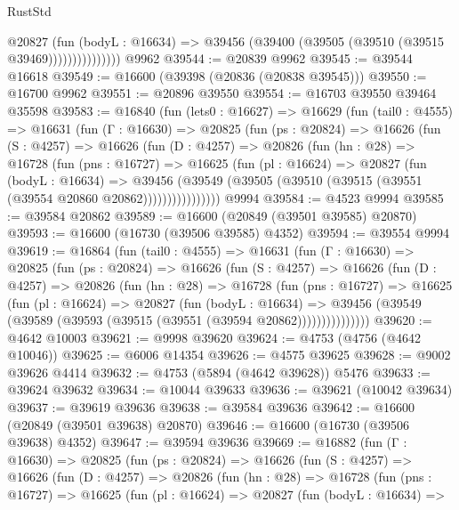 \begin{lexlean}{RustStd}
\begin{coremodule}
{\begin{coremodule}
{{{{{{{{{{{{{{{{{{{{{{{{{{{{{{{{{{{{{{{{{{{{{{{{{{{{{{{                      @20827
                        (fun (bodyL : @16634) =>
                        @39456 (@39400 (@39505 (@39510 (@39515 @39469)))))))))))))))
    @9962
@39544 := @20839 @9962
@39545 := @39544 @16618
@39549 := @16600 (@39398 (@20836 (@20838 @39545)))
@39550 := @16700 @9962
@39551 := @20896 @39550
@39554 := @16703 @39550 @39464 @35598
@39583 := @16840
    (fun (lets0 : @16627) =>
    @16629
      (fun (tail0 : @4555) =>
      @16631
        (fun (Γ : @16630) =>
        @20825
          (fun (ps : @20824) =>
          @16626
            (fun (S : @4257) =>
            @16626
              (fun (D : @4257) =>
              @20826
                (fun (hn : @28) =>
                @16728
                  (fun (pns : @16727) =>
                  @16625
                    (fun (pl : @16624) =>
                    @20827
                      (fun (bodyL : @16634) =>
                      @39456
                        (@39549
                          (@39505 (@39510 (@39515 (@39551 (@39554 @20860 @20862))))))))))))))))
    @9994
@39584 := @4523 @9994
@39585 := @39584 @20862
@39589 := @16600 (@20849 (@39501 @39585) @20870)
@39593 := @16600 (@16730 (@39506 @39585) @4352)
@39594 := @39554 @9994
@39619 := @16864
    (fun (tail0 : @4555) =>
    @16631
      (fun (Γ : @16630) =>
      @20825
        (fun (ps : @20824) =>
        @16626
          (fun (S : @4257) =>
          @16626
            (fun (D : @4257) =>
            @20826
              (fun (hn : @28) =>
              @16728
                (fun (pns : @16727) =>
                @16625
                  (fun (pl : @16624) =>
                  @20827
                    (fun (bodyL : @16634) =>
                    @39456 (@39549 (@39589 (@39593 (@39515 (@39551 (@39594 @20862)))))))))))))))
@39620 := @4642 @10003
@39621 := @9998 @39620
@39624 := @4753 (@4756 (@4642 @10046))
@39625 := @6006 @14354
@39626 := @4575 @39625
@39628 := @9002 @39626 @4414
@39632 := @4753 (@5894 (@4642 @39628)) @5476
@39633 := @39624 @39632
@39634 := @10044 @39633
@39636 := @39621 (@10042 @39634)
@39637 := @39619 @39636
@39638 := @39584 @39636
@39642 := @16600 (@20849 (@39501 @39638) @20870)
@39646 := @16600 (@16730 (@39506 @39638) @4352)
@39647 := @39594 @39636
@39669 := @16882
    (fun (Γ : @16630) =>
    @20825
      (fun (ps : @20824) =>
      @16626
        (fun (S : @4257) =>
        @16626
          (fun (D : @4257) =>
          @20826
            (fun (hn : @28) =>
            @16728
              (fun (pns : @16727) =>
              @16625
                (fun (pl : @16624) =>
                @20827
                  (fun (bodyL : @16634) =>
}}}}}}}}}}}}}}}}}}}}}}}}}}}}}}}}}}}}}}}}}}}}}}}}}}}}}}}
\end{coremodule}}
\end{coremodule}
\end{lexlean}

